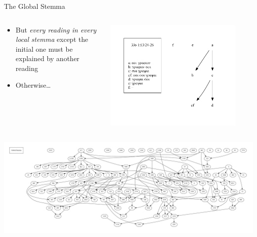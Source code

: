 \documentclass[10pt]{beamer}
\begin{document}
	\begin{frame}{The Global Stemma}
		\begin{columns}
			\begin{column}{0.45\textwidth}
				\begin{itemize}
					\item But \emph{every reading in every local stemma} except the initial one must be explained by another reading
					\item Otherwise…
				\end{itemize}
			\end{column}
			\begin{column}{0.45\textwidth}
				\begin{center}
					\includegraphics[width=0.875\textwidth]{../img/B25K1V13U24-26-local-stemma-incomplete.pdf}
				\end{center}	
			\end{column}
		\end{columns}
		\begin{center}
			\includegraphics[width=\textwidth]{../img/global-stemma-incomplete.pdf}
		\end{center}	
	\end{frame}
\end{document}
